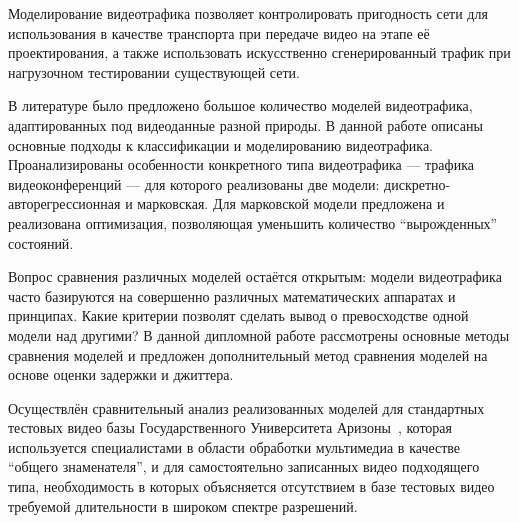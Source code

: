 Моделирование видеотрафика позволяет контролировать
пригодность сети для использования в качестве транспорта
при передаче видео на этапе её проектирования,
а также использовать искусственно сгенерированный трафик
при нагрузочном тестировании существующей сети.

В литературе было предложено большое количество моделей
видеотрафика, адаптированных под видеоданные разной природы.
В данной работе описаны основные подходы к классификации
и моделированию видеотрафика. Проанализированы особенности
конкретного типа видеотрафика --- трафика видеоконференций
--- для которого реализованы две модели:
дискретно-авторегрессионная и марковская. Для марковской
модели предложена и реализована оптимизация, позволяющая
уменьшить количество ``вырожденных'' состояний.

Вопрос сравнения различных моделей остаётся открытым:
модели видеотрафика часто базируются на совершенно
различных математических аппаратах и принципах.
Какие критерии позволят сделать вывод о превосходстве
одной модели над другими? В данной дипломной работе
рассмотрены основные методы сравнения моделей и
предложен дополнительный метод сравнения моделей
на основе оценки задержки и джиттера.

Осуществлён сравнительный анализ реализованных моделей
для стандартных тестовых видео базы Государственного
Университета Аризоны~\cite{}, которая используется
специалистами в области обработки мультимедиа в качестве
``общего знаменателя'', и для самостоятельно записанных
видео подходящего типа, необходимость в которых объясняется
отсутствием в базе тестовых видео требуемой длительности
в широком спектре разрешений.
